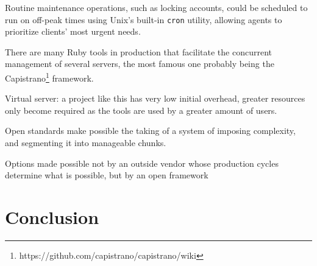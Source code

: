 \documentclass[12pt]{article}
\begin{document}
Routine maintenance operations, such as locking accounts, could be
scheduled to run on off-peak times using Unix's built-in \texttt{cron}
utility, allowing agents to prioritize clients' most urgent needs. 


There are many Ruby tools in production that facilitate the concurrent
management of several servers, the most famous one probably being the
Capistrano\footnote{https://github.com/capistrano/capistrano/wiki} framework.

Virtual server: a project like this has very low initial overhead,
greater resources only become required as the tools are used by a
greater amount of users.  


Open standards make possible the taking of a system of imposing
complexity, and segmenting it into manageable chunks.



Options made possible not by an outside vendor whose production cycles
determine what is possible, but by an open framework 


\section{Conclusion}
\end{document}
